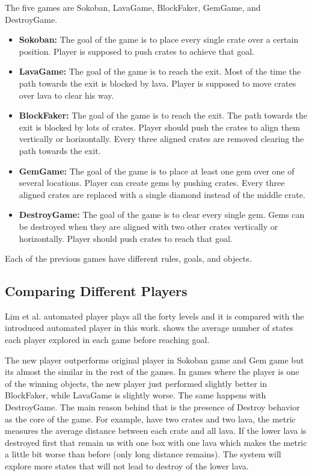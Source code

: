 The five games are Sokoban, LavaGame, BlockFaker, GemGame, and DestroyGame.
\begin{itemize} \itemsep0pt \parskip0pt 
	\item \textbf{Sokoban:} The goal of the game is to place every single crate over a certain position. Player is supposed to push crates to achieve that goal.
	\item \textbf{LavaGame:} The goal of the game is to reach the exit. Most of the time the path towards the exit is blocked by lava. Player is supposed to move crates over lava to clear his way.
	\item \textbf{BlockFaker:} The goal of the game is to reach the exit. The path towards the exit is blocked by lots of crates. Player should push the crates to align them vertically or horizontally. Every three aligned crates are removed clearing the path towards the exit.
	\item \textbf{GemGame:} The goal of the game is to place at least one gem over one of several locations. Player can create gems by pushing crates. Every three aligned crates are replaced with a single diamond instead of the middle crate.
	\item \textbf{DestroyGame:} The goal of the game is to clear every single gem. Gems can be destroyed when they are aligned with two other crates vertically or horizontally. Player should push crates to reach that goal.
\end{itemize}

Each of the previous games have different rules, goals, and objects.
\subsection{Comparing Different Players}
Lim et al.\cite{puzzleScriptGeneration} automated player plays all the forty levels and it is compared with the introduced automated player in this work.  shows the average number of states each player explored in each game before reaching goal.


The new player outperforms original player in Sokoban game and Gem game but its almost the similar in the rest of the games. In games where the player is one of the winning objects, the new player just performed slightly better in BlockFaker, while LavaGame is slightly worse. The same happens with DestroyGame. The main reason behind that is the presence of Destroy behavior as the core of the game. For example,  have two crates and two lava, the metric measures the average distance between each crate and all lava. If the lower lava is destroyed first that remain us with one box with one lava which makes the metric a little bit worse than before (only long distance remains). The system will explore more states that will not lead to destroy of the lower lava.

